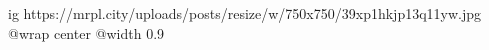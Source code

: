  
 
 
 
 

\ifcmt
  ig https://mrpl.city/uploads/posts/resize/w/750x750/39xp1hkjp13q11yw.jpg
  @wrap center
  @width 0.9
\fi
